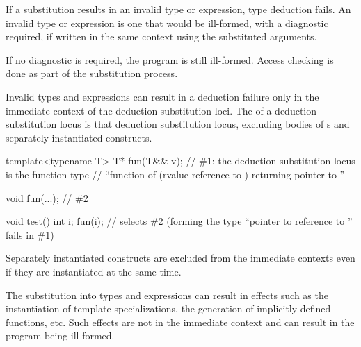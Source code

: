 \pnum
If a substitution results in an invalid type or expression, type deduction fails. An
invalid type or expression is one that would be ill-formed, with a diagnostic
required, if written in the same context using the substituted arguments.
\begin{note}
If no diagnostic is required, the program is still ill-formed.
Access checking is done as part of the substitution process.
\end{note}
Invalid types and expressions can result in a deduction failure
only in the immediate context of the deduction substitution loci.
The  of a deduction substitution locus
is that deduction substitution locus,
excluding bodies of s and separately instantiated constructs.
\begin{example}
\begin{codeblock}
template<typename T>
T* fun(T&& v);  // \#1: the deduction substitution locus is the function type
                // ``function of (rvalue reference to ) returning pointer to ''

void fun(...);  // \#2

void test()
{
  int i;
  fun(i);       // selects \#2 (forming the type ``pointer to reference to '' fails in \#1)
}
\end{codeblock}
\end{example}
\begin{note}
Separately instantiated constructs are excluded from the immediate contexts
even if they are instantiated at the same time.
\end{note}
\begin{note}
The substitution into types and expressions can result
in effects such as the instantiation of template specializations,
the generation of implicitly-defined functions, etc.
Such effects are not in the immediate context
and can result in the program being ill-formed.
\end{note}

